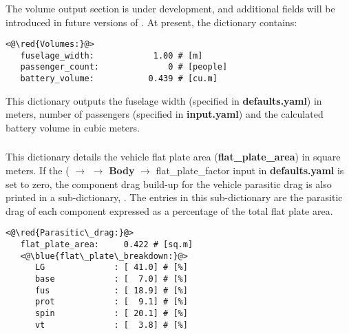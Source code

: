 \subsubsection{}
The volume output section is under development, and additional fields will be introduced in future versions of \hydra. At present, the dictionary contains:
\begin{lstlisting}
<@\red{Volumes:}@>
   fuselage_width:            1.00 # [m]
   passenger_count:              0 # [people]
   battery_volume:           0.439 # [cu.m]
\end{lstlisting}
This dictionary outputs the fuselage width (specified in \textbf{defaults.yaml}) in meters, number of passengers (specified in \textbf{input.yaml}) and the calculated battery volume in cubic meters. 

\subsubsection{}
This dictionary details the vehicle flat plate area (\textbf{flat\_plate\_area}) in square meters. If the ( $\rightarrow$  $\rightarrow$ \textbf{Body} $\rightarrow$ flat\_plate\_factor input in \textbf{defaults.yaml} is set to zero, the component drag build-up for the vehicle parasitic drag is also printed in a sub-dictionary, . The entries in this sub-dictionary are the parasitic drag of each component expressed as a percentage of the total flat plate area. 
\begin{lstlisting}
<@\red{Parasitic\_drag:}@>
   flat_plate_area:     0.422 # [sq.m] 
   <@\blue{flat\_plate\_breakdown:}@> 
      LG              : [ 41.0] # [%]
      base            : [  7.0] # [%]
      fus             : [ 18.9] # [%]
      prot            : [  9.1] # [%]
      spin            : [ 20.1] # [%]
      vt              : [  3.8] # [%]
\end{lstlisting}

